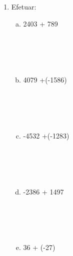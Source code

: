 \documentclass[a4paper,14pt]{article}
\begin{document}
\begin{multicols}{2}
\begin{enumerate}
    		\item Efetuar:
    		\begin{enumerate}[a)]
    			\item 2403 + 789 \\\\\\\\\\
    			\item 4079 +(-1586) \\\\\\\\\\
    			\item -4532 +(-1283) \\\\\\\\\\
    			\item -2386 + 1497 \\\\\\\\\\
    			\item 36 + (-27) \\\\\\\\\\
    		\end{enumerate}
    	\end{enumerate}
    	$~$ \\ $~$ \\ $~$ \\ $~$ \\ $~$ \\ $~$ \\ $~$ \\ $~$
	\end{multicols}
\end{document}
